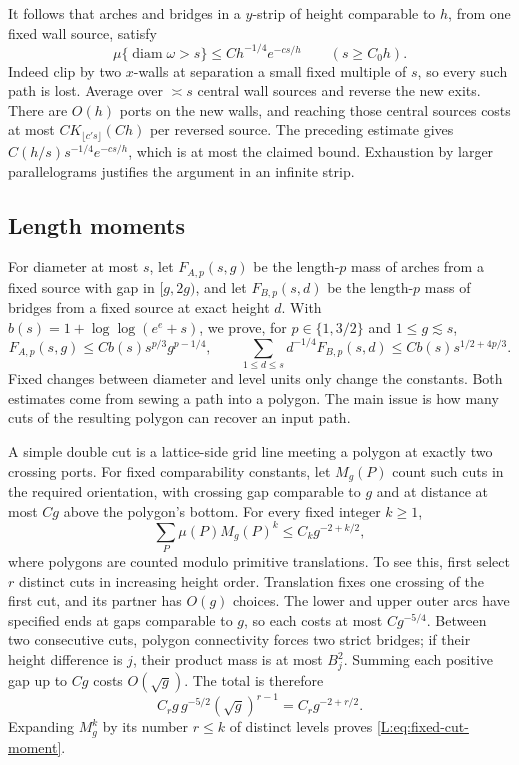 \documentclass[11pt]{article}
\numberwithin{equation}{section}
\theoremstyle{definition}\newtheorem{definition}[theorem]{Definition}
\theoremstyle{remark}\newtheorem{remark}[theorem]{Remark}
\begin{document}
It follows that arches and bridges in a $y$-strip of height comparable
to $h$, from one fixed wall source, satisfy
\[
 \mu\{\operatorname{diam}\omega>s\}
 \le C h^{-1/4}e^{-cs/h}\qquad(s\ge C_0h).
\]
Indeed clip by two $x$-walls at separation a small fixed multiple of
$s$, so every such path is lost.  Average over $\asymp s$ central
wall sources and reverse the new exits.  There are $O(h)$ ports on
the new walls, and reaching those central sources costs at most
$C K_{\lfloor c's\rfloor}(Ch)$ per reversed source.  The preceding
estimate gives $C(h/s)s^{-1/4}e^{-cs/h}$, which is at most the claimed
bound.  Exhaustion by larger parallelograms justifies the argument in
an infinite strip.

\subsection{Length moments}\label{L:step19}\label{L:prop:moments}

For diameter at most $s$, let $F_{A,p}(s,g)$ be the length-$p$ mass of
arches from a fixed source with gap in $[g,2g)$, and let
$F_{B,p}(s,d)$ be the length-$p$ mass of bridges from a fixed source
at exact height $d$.  With $b(s)=1+\log\log(e^e+s)$, we prove, for
$p\in\{1,3/2\}$ and $1\le g\lesssim s$,
\begin{equation}\label{L:eq:geometric-moments}
 F_{A,p}(s,g)\le Cb(s)s^{p/3}g^{p-1/4},\qquad
 \sum_{1\le d\le s}d^{-1/4}F_{B,p}(s,d)
 \le Cb(s)s^{1/2+4p/3}.
\end{equation}
Fixed changes between diameter and level units only change the constants.
Both estimates come from sewing a path into a polygon.  The main issue
is how many cuts of the resulting polygon can recover an input path.

A simple double cut is a lattice-side grid line meeting a polygon at
exactly two crossing ports.  For fixed comparability constants, let
$M_g(P)$ count such cuts in the required orientation, with crossing
gap comparable to $g$ and at distance at most $Cg$ above the polygon's
bottom.  For every fixed integer $k\ge1$,
\begin{equation}\label{L:eq:fixed-cut-moment}
 \sum_P\mu(P)M_g(P)^k\le C_k g^{-2+k/2},
\end{equation}
where polygons are counted modulo primitive translations.  To see
this, first select $r$ distinct cuts in increasing height order.
Translation fixes one crossing of the first cut, and its partner has
$O(g)$ choices.  The lower and upper outer arcs have specified ends
at gaps comparable to $g$, so each costs at most $Cg^{-5/4}$.
Between two consecutive cuts, polygon connectivity forces two strict
bridges; if their height difference is $j$, their product mass is at
most $B_j^2$.  Summing each positive gap up to $Cg$ costs $O(\sqrt g)$.
The total is therefore
\[
 C_r g\,g^{-5/2}(\sqrt g)^{r-1}=C_r g^{-2+r/2}.
\]
Expanding $M_g^k$ by its number $r\le k$ of distinct levels proves
\eqref{L:eq:fixed-cut-moment}.
\end{document}
